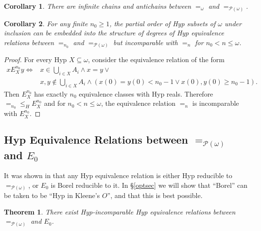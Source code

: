 \documentclass[11pt, english]{article}
\newtheorem{thm}{Theorem}
\newtheorem{cor}{Corollary}
\begin{document}
\begin{cor}
There are infinite chains and antichains between $=_{\omega}$ and
$=_{\mathcal{P}(\omega)}$.
\end{cor}

\begin{cor}
For any finite $n_0\geq 1$, the partial order of Hyp subsets of $\omega$
under inclusion can be embedded into the structure of degrees of Hyp
equivalence relations between $=_{n_0}$ and
$=_{\mathcal{P}(\omega)}$ but incomparable with $=_n$ for
$n_0<n\leq\omega$.
\end{cor}

\begin{proof}
For every Hyp $X\subseteq\omega$, consider the equivalence relation
of the form
\begin{align*}
 xE^{n_0}_{X}y \iff & x\in \bigcup_{i\in X}A_i\wedge x=y\vee\\
                    & x,y\notin \bigcup_{i\in X}A_i\wedge(x(0)=y(0)<n_0-1\vee x(0),y(0)\geq n_0-1).
\end{align*}
Then $E^{n_0}_{X}$ has exactly $n_0$ equivalence classes with Hyp
reals. Therefore $=_{n_0}\leq_H E^{n_0}_X$ and for
$n_0<n\leq\omega$, the equivalence relation $=_n$ is incomparable
with $E^{n_0}_{X}$.
\end{proof}


\subsection{Hyp Equivalence Relations between $=_{\mathcal{P}(\omega)}$ and $E_0$}

It was shown in \cite{hakelou90} that any Hyp equivalence relation
is either Hyp reducible to $=_{\mathcal{P}(\omega)}$, or $E_0$ is
Borel reducible to it. In \S\ref{optsec} we will show that ``Borel''
can be taken to be ``Hyp in Kleene's ${O}$'', and that this is best
possible.

\begin{thm}\label{thm12}
There exist Hyp-incomparable Hyp equivalence relations between
$=_{\mathcal{P}(\omega)}$ and $E_0$.
\end{thm}
\end{document}
